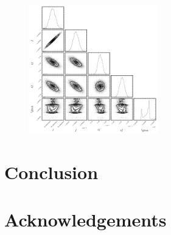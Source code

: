 \documentclass[aps, prd, twocolumn, superscriptaddress, floatfix, showpacs, nofootinbib, longbibliography]{revtex4-1}
\begin{document}
\begin{figure}[htb]
\centering
\includegraphics[width=0.5\textwidth]{single_glitch_glitchSearch_corner}
\caption{}
\label{fig_glitch_posteriors}
\end{figure}

\section{Conclusion}
\label{sec_conclusion}



\section{Acknowledgements}


\end{document}
